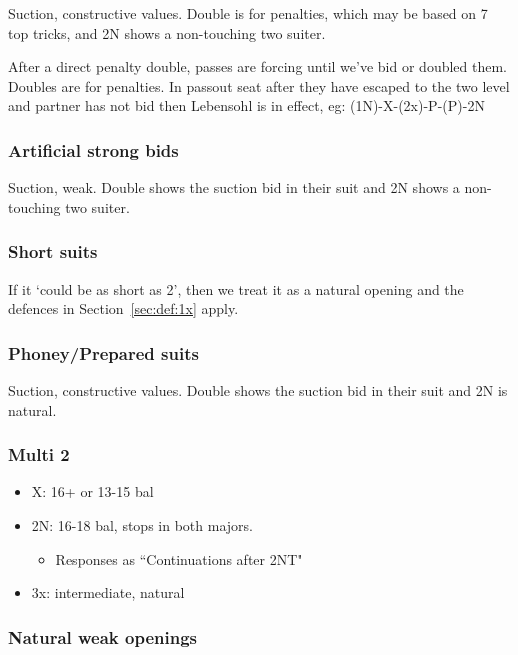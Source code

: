 \documentclass[a4paper,14pt]{extarticle}
\begin{document}
Suction, constructive values. Double is for penalties, which may be based on 7
top tricks, and 2N shows a non-touching two suiter. 

After a direct penalty double, passes are forcing until we've bid or doubled
them.  Doubles are for penalties. In passout seat after they have escaped to
the two level and partner has not bid then Lebensohl 
is in effect, eg: (1N)-X-(2x)-P-(P)-2N

\subsubsection{Artificial strong bids}
\label{sec:def:strong}

Suction, weak. Double shows the suction bid in their suit and 2N shows a
non-touching two suiter. 

\subsubsection{Short suits}
\label{sec:def:short}

If it `could be as short as 2', then we treat it as a natural opening and the
defences in Section~\ref{sec:def:1x} apply.

\subsubsection{Phoney/Prepared suits}
\label{sec:def:phoney}

Suction, constructive values. Double shows the suction bid in their suit and 2N
is natural. 

\subsubsection{Multi 2\diamonds}
\label{sec:def:multi}

\begin{itemize}
\item X: 16+ or 13-15 bal
\item 2N: 16-18 bal, stops in both majors.
	\begin{itemize}
	\item Responses as ``Continuations after 2NT" 
	\end{itemize}
\item 3x: intermediate, natural
\end{itemize}

\subsubsection{Natural weak openings}
\label{sec:def:weak}
\end{document}
